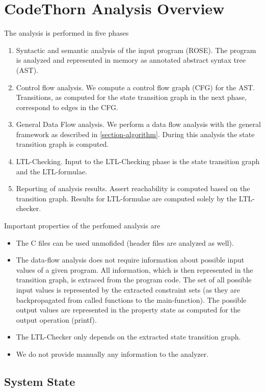 \section{CodeThorn Analysis Overview}

The analysis is performed in five phases

\begin{enumerate}
\item Syntactic and semantic analysis of the input program (ROSE). The program is analyzed and represented in memory as annotated abstract syntax tree (AST).
\item Control flow analysis. We compute a control flow graph (CFG) for the AST. Transitions, as computed for the state transition graph in the next phase, correspond to edges in the CFG.
\item General Data Flow analysis. We perform a data flow analysis with the general framework as described in \ref{section-algorithm}. During this analysis the state transition graph is computed.
\item LTL-Checking. Input to the LTL-Checking phase is the state transition graph and the LTL-formulae.
\item Reporting of analysis results. Assert reachability is computed based on the transition graph. Results for LTL-formulae are computed solely by the LTL-checker.
\end{enumerate}

Important properties of the perfomed analysis are

\begin{itemize}
\item The C files can be used unmofided (header files are analyzed as well).
\item The data-flow analysis does not require information about possible input values of a
  given program. All information, which is then represented in the
  transition graph, is extraced from the program code. The set of all
  possible input values is represented by the extracted constraint
  sets (as they are backpropagated from called functions to the
  main-function). The possible output values are represented in the
  property state as computed for the output operation (printf).
\item The LTL-Checker only depends on the extracted state transition graph.
\item We do not provide manually any information to the analyzer.
\end{itemize}

\subsection{System State}

